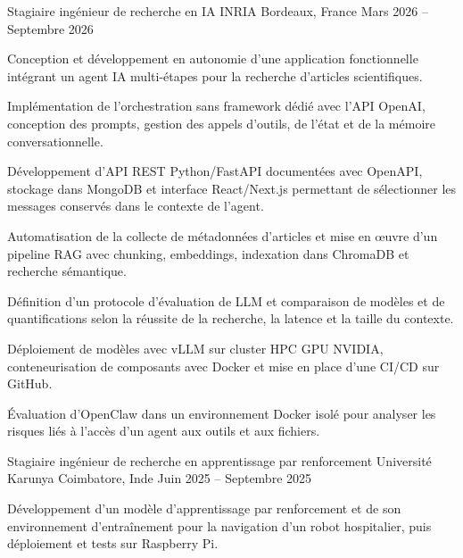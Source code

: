 
\begin{cventries}
  \cventry
    {Stagiaire ingénieur de recherche en IA}
    {INRIA}
    {Bordeaux, France}
    {Mars 2026 -- Septembre 2026}
    {
      \begin{cvitems}
        \item {Conception et développement en autonomie d’une application fonctionnelle intégrant un agent IA multi-étapes pour la recherche d’articles scientifiques.}
        \item {Implémentation de l’orchestration sans framework dédié avec l’API OpenAI, conception des prompts, gestion des appels d’outils, de l’état et de la mémoire conversationnelle.}
        \item {Développement d’API REST Python/FastAPI documentées avec OpenAPI, stockage dans MongoDB et interface React/Next.js permettant de sélectionner les messages conservés dans le contexte de l’agent.}
        \item {Automatisation de la collecte de métadonnées d’articles et mise en œuvre d’un pipeline RAG avec chunking, embeddings, indexation dans ChromaDB et recherche sémantique.}
        \item {Définition d’un protocole d’évaluation de LLM et comparaison de modèles et de quantifications selon la réussite de la recherche, la latence et la taille du contexte.}
        \item {Déploiement de modèles avec vLLM sur cluster HPC GPU NVIDIA, conteneurisation de composants avec Docker et mise en place d’une CI/CD sur GitHub.}
        \item {Évaluation d’OpenClaw dans un environnement Docker isolé pour analyser les risques liés à l’accès d’un agent aux outils et aux fichiers.}
      \end{cvitems}
    }

  \cventry
    {Stagiaire ingénieur de recherche en apprentissage par renforcement}
    {Université Karunya}
    {Coimbatore, Inde}
    {Juin 2025 -- Septembre 2025}
    {
      \begin{cvitems}
        \item {Développement d’un modèle d’apprentissage par renforcement et de son environnement d’entraînement pour la navigation d’un robot hospitalier, puis déploiement et tests sur Raspberry Pi.}
      \end{cvitems}
    }
\end{cventries}
